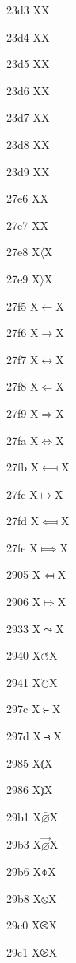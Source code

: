 \documentclass[11pt]{article}
\begin{document}
23d3 X{\metra{\bm}}X

23d4 X{\metra{\mbb}}X

23d5 X{\metra{\bbm}}X

23d6 X{\metra{\bb}}X

23d7 X{\metra{\tsbm}}X

23d8 X{\metra{\tsmm}}X

23d9 X{\metra{\ps}}X

27e6 X{\textlbrackdbl}X

27e7 X{\textrbrackdbl}X

27e8 X{\ensuremath{\langle}}X

27e9 X{\ensuremath{\rangle}}X

27f5 X{\ensuremath{\longleftarrow}}X

27f6 X{\ensuremath{\longrightarrow}}X

27f7 X{\ensuremath{\longleftrightarrow}}X

27f8 X{\ensuremath{\Longleftarrow}}X

27f9 X{\ensuremath{\Longrightarrow}}X

27fa X{\ensuremath{\Longleftrightarrow}}X

27fb X{\ensuremath{\longmapsfrom}}X

27fc X{\ensuremath{\longmapsto}}X

27fd X{\ensuremath{\Longmapsfrom}}X

27fe X{\ensuremath{\Longmapsto}}X

2905 X{\ensuremath{\Mapsfrom}}X

2906 X{\ensuremath{\Mapsto}}X

2933 X{\ensuremath{\leadsto}}X

2940 X{\ensuremath{\circlearrowleft}}X

2941 X{\ensuremath{\circlearrowright}}X

297c X{\ensuremath{\strictfi}}X

297d X{\ensuremath{\strictif}}X

2985 X{\ensuremath{\Lparen}}X

2986 X{\ensuremath{\Rparen}}X

29b1 X{\ensuremath{\bar{\varnothing}}}X

29b3 X{\ensuremath{\vec{\varnothing}}}X

29b6 X{\ensuremath{\obar}}X

29b8 X{\ensuremath{\obslash}}X

29c0 X{\ensuremath{\olessthan}}X

29c1 X{\ensuremath{\ogreaterthan}}X
\end{document}
